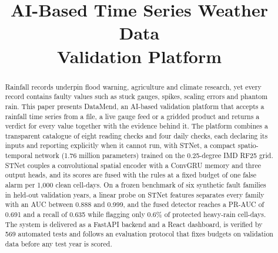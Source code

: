 \documentclass[conference,a4paper]{IEEEtran}
\begin{document}
\title{AI-Based Time Series Weather Data\\Validation Platform}

\author{%
\and
{}
\and
{}
\and
{}
}

\maketitle

\begin{abstract}
Rainfall records underpin flood warning, agriculture and climate research, yet every record contains faulty values such as stuck gauges, spikes, scaling errors and phantom rain. This paper presents DataMend, an AI-based validation platform that accepts a rainfall time series from a file, a live gauge feed or a gridded product and returns a verdict for every value together with the evidence behind it. The platform combines a transparent catalogue of eight reading checks and four daily checks, each declaring its inputs and reporting explicitly when it cannot run, with STNet, a compact spatio-temporal network (1.76 million parameters) trained on the 0.25-degree IMD RF25 grid. STNet couples a convolutional spatial encoder with a ConvGRU memory and three output heads, and its scores are fused with the rules at a fixed budget of one false alarm per 1,000 clean cell-days. On a frozen benchmark of six synthetic fault families in held-out validation years, a linear probe on STNet features separates every family with an AUC between 0.888 and 0.999, and the fused detector reaches a PR-AUC of 0.691 and a recall of 0.635 while flagging only 0.6\% of protected heavy-rain cell-days. The system is delivered as a FastAPI backend and a React dashboard, is verified by 569 automated tests and follows an evaluation protocol that fixes budgets on validation data before any test year is scored.
\end{abstract}
\end{document}
